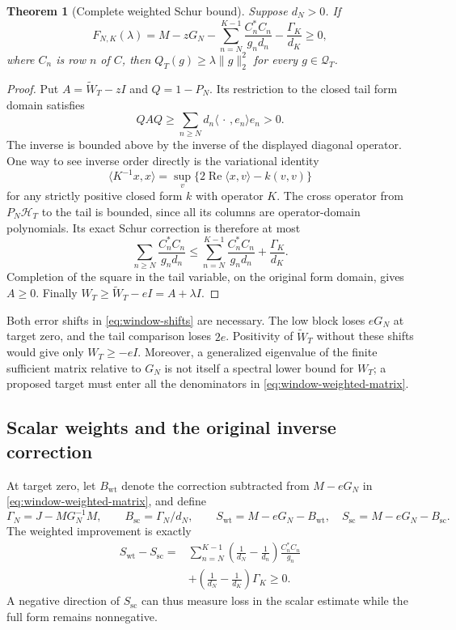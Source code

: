 \documentclass[11pt]{article}
\newtheorem{theorem}{Theorem}[section]
\theoremstyle{definition}
\theoremstyle{remark}
\numberwithin{equation}{section}
\begin{document}
\begin{theorem}[Complete weighted Schur bound]
\label{thm:window-weighted}
Suppose $d_N>0$.  If
\begin{equation}
 F_{N,K}(\lambda)=M-zG_N
   -\sum_{n=N}^{K-1}\frac{C_n^*C_n}{g_nd_n}
   -\frac{\Gamma_K}{d_K}\ge0,
 \label{eq:window-weighted-matrix}
\end{equation}
where $C_n$ is row $n$ of $C$, then
$Q_T(g)\ge\lambda\|g\|_2^2$ for every $g\in\mathcal Q_T$.
\end{theorem}
\begin{proof}
Put $A=\widetilde W_T-zI$ and $Q=1-P_N$.  Its restriction to
the closed tail form domain satisfies
\[
 QAQ\ge\sum_{n\ge N}d_n\langle\,\cdot\,,e_n\rangle e_n>0.
\]
The inverse is bounded above by the inverse of the displayed diagonal
operator.  One way to see inverse order directly is the variational
identity
\[
 \langle K^{-1}x,x\rangle
   =\sup_v\{2\operatorname{Re}\langle x,v\rangle-k(v,v)\}
\]
for any strictly positive closed form $k$ with operator $K$.
The cross operator from $P_N\mathcal H_T$ to the tail is bounded,
since all its columns are operator-domain polynomials.  Its exact
Schur correction is therefore at most
\[
 \sum_{n\ge N}\frac{C_n^*C_n}{g_nd_n}
 \le\sum_{n=N}^{K-1}\frac{C_n^*C_n}{g_nd_n}
          +\frac{\Gamma_K}{d_K}.
\]
Completion of the square in the tail variable, on the original
form domain, gives $A\ge0$.  Finally
$W_T\ge\widetilde W_T-eI=A+\lambda I$.
\end{proof}

Both error shifts in \eqref{eq:window-shifts} are necessary.  The
low block loses $eG_N$ at target zero, and the tail comparison loses
$2e$.  Positivity of $\widetilde W_T$ without these shifts would
give only $W_T\ge-eI$.  Moreover, a generalized eigenvalue of the
finite sufficient matrix relative to $G_N$ is not itself a spectral
lower bound for $W_T$; a proposed target must enter all the
denominators in \eqref{eq:window-weighted-matrix}.

\subsection{Scalar weights and the original inverse correction}

At target zero, let $B_{\mathrm{wt}}$ denote the correction subtracted
from $M-eG_N$ in \eqref{eq:window-weighted-matrix}, and define
\[
 \Gamma_N=J-MG_N^{-1}M,\qquad
 B_{\mathrm{sc}}=\Gamma_N/d_N,\qquad
 S_{\mathrm{wt}}=M-eG_N-B_{\mathrm{wt}},\quad
 S_{\mathrm{sc}}=M-eG_N-B_{\mathrm{sc}}.
\]
The weighted improvement is exactly
\begin{equation}
\begin{split}
 S_{\mathrm{wt}}-S_{\mathrm{sc}}
  ={}&\sum_{n=N}^{K-1}
        \left(\frac1{d_N}-\frac1{d_n}\right)\frac{C_n^*C_n}{g_n}\\
   &+\left(\frac1{d_N}-\frac1{d_K}\right)\Gamma_K\ge0.
\end{split}
\label{eq:window-weighted-gain}
\end{equation}
A negative direction of $S_{\mathrm{sc}}$ can thus measure loss in
the scalar estimate while the full form remains nonnegative.
\end{document}
